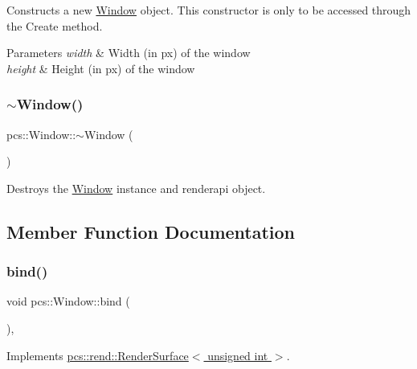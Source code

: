 Constructs a new \hyperlink{classpcs_1_1Window}{Window} object. This constructor is only to be accessed through the Create method. 


\begin{DoxyParams}{Parameters}
{\em width} & Width (in px) of the window \\
\hline
{\em height} & Height (in px) of the window \\
\hline
\end{DoxyParams}
\mbox{\label{classpcs_1_1Window_a579734a5cb40ca904947eed2f5a853bf}} 
\subsubsection{\texorpdfstring{$\sim$\+Window()}{~Window()}}
{\footnotesize\ttfamily pcs\+::\+Window\+::$\sim$\+Window (\begin{DoxyParamCaption}{ }\end{DoxyParamCaption})\hspace{0.3cm}{\ttfamily [virtual]}}



Destroys the \hyperlink{classpcs_1_1Window}{Window} instance and renderapi object. 



\subsection{Member Function Documentation}
\mbox{\label{classpcs_1_1Window_aa6e00bee6910b3146481dee7aab69cfb}} 
\subsubsection{\texorpdfstring{bind()}{bind()}}
{\footnotesize\ttfamily void pcs\+::\+Window\+::bind (\begin{DoxyParamCaption}{ }\end{DoxyParamCaption})\hspace{0.3cm}{\ttfamily [override]}, {\ttfamily [virtual]}}



Implements \hyperlink{classpcs_1_1rend_1_1RenderSurface_a79c0b291ed5a7b901fe4233bf8b376f2}{pcs\+::rend\+::\+Render\+Surface$<$ unsigned int $>$}.

